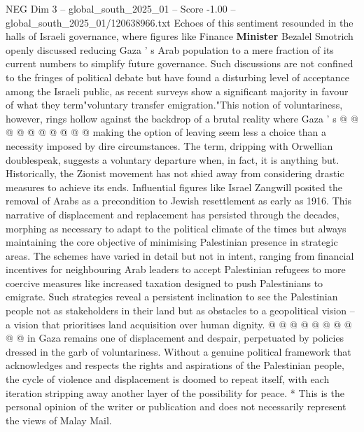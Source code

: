 \begin{textsample}{NEG Dim 3 – global\_south\_2025\_01 – Score -1.00 – global\_south\_2025\_01/120638966.txt}
Echoes of this sentiment resounded in the halls of Israeli governance, where figures like Finance \textbf{Minister} Bezalel Smotrich openly discussed reducing Gaza ' s Arab population to a mere fraction of its current numbers to simplify future governance.
Such discussions are not confined to the fringes of political debate but have found a disturbing level of acceptance among the Israeli public, as recent surveys show a significant majority in favour of what they term"voluntary transfer emigration."This notion of voluntariness, however, rings hollow against the backdrop of a brutal reality where Gaza ' s @ @ @ @ @ @ @ @ @ @ making the option of leaving seem less a choice than a necessity imposed by dire circumstances.
The term, dripping with Orwellian doublespeak, suggests a voluntary departure when, in fact, it is anything but.
Historically, the Zionist movement has not shied away from considering drastic measures to achieve its ends.
Influential figures like Israel Zangwill posited the removal of Arabs as a precondition to Jewish resettlement as early as 1916.
This narrative of displacement and replacement has persisted through the decades, morphing as necessary to adapt to the political climate of the times but always maintaining the core objective of minimising Palestinian presence in strategic areas.
The schemes have varied in detail but not in intent, ranging from financial incentives for neighbouring Arab leaders to accept Palestinian refugees to more coercive measures like increased taxation designed to push Palestinians to emigrate.
Such strategies reveal a persistent inclination to see the Palestinian people not as stakeholders in their land but as obstacles to a geopolitical vision -- a vision that prioritises land acquisition over human dignity. @ @ @ @ @ @ @ @ @ @ in Gaza remains one of displacement and despair, perpetuated by policies dressed in the garb of voluntariness.
Without a genuine political framework that acknowledges and respects the rights and aspirations of the Palestinian people, the cycle of violence and displacement is doomed to repeat itself, with each iteration stripping away another layer of the possibility for peace. * This is the personal opinion of the writer or publication and does not necessarily represent the views of Malay Mail.

\end{textsample}
